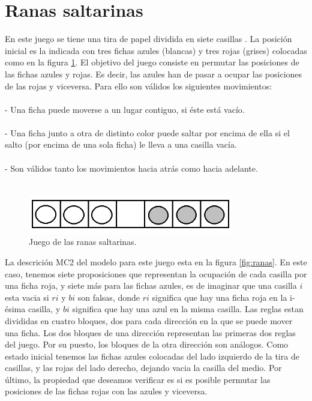 \section{Ranas saltarinas}

En este juego se tiene una tira de papel dividida en siete casillas \cite{Juegos:11}. La posición inicial es la indicada con tres fichas azules (blancas) y tres rojas (grises) colocadas como en la figura \ref{fig:ranasjuego}. El objetivo del juego consiste en permutar las posiciones de las fichas azules y rojas. Es decir, las azules han de pasar a ocupar las posiciones de las rojas y viceversa. Para ello son válidos los siguientes movimientos:\\
\\
- Una ficha puede moverse a un lugar contiguo, si éste está vacío.\\
\\
- Una ficha junto a otra de distinto color puede saltar por encima de ella si el salto (por encima de una sola ficha) le lleva a una casilla vacía.\\
\\
- Son válidos tanto los movimientos hacia atrás como hacia adelante.\\
\\

\begin{figure}[H]
  \centering
  \includegraphics[width=0.8\textwidth]{Figures/ranasjuego.png}
  \caption{Juego de las ranas saltarinas.}
  \label{fig:ranasjuego}
\end{figure}

\noindent La descrición MC2 del modelo para este juego esta en la figura \ref{fig:ranas}. En este caso, tenemos siete proposiciones que representan la ocupación de cada casilla por una ficha roja, y siete más para las fichas azules, es de imaginar que una casilla $i$ esta vacia si $ri$ y $bi$ son falsas, donde $ri$ significa que hay una ficha roja en la i-ésima casilla, y $bi$ significa que hay una azul en la misma casilla. Las reglas estan divididas en cuatro bloques, dos para cada dirección en la que se puede mover una ficha. Los dos bloques de una dirección representan las primeras dos reglas del juego. Por su puesto, los bloques de la otra dirección son análogos. Como estado inicial tenemos las fichas azules colocadas del lado izquierdo de la tira de casillas, y las rojas del lado derecho, dejando vacia la casilla del medio. Por último, la propiedad que deseamos verificar es si es posible permutar las posiciones de las fichas rojas con las azules y viceversa. 

